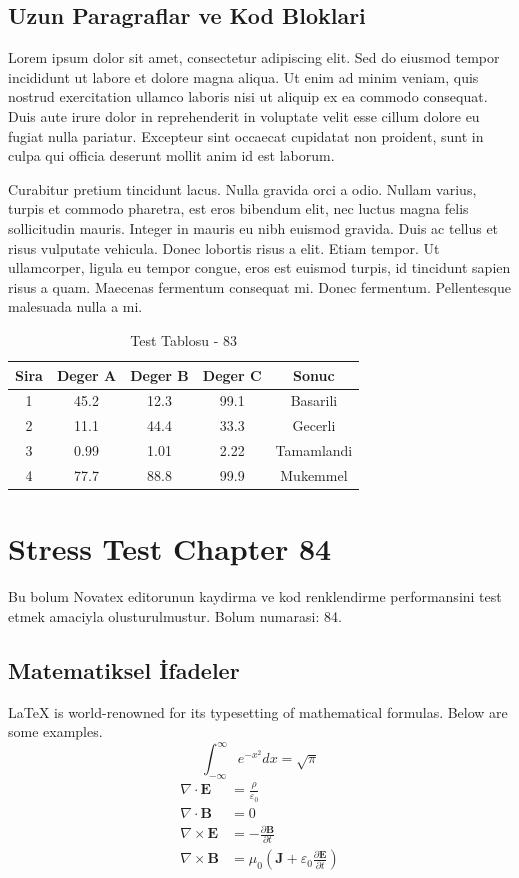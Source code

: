\documentclass[12pt,a4paper]{article}
\begin{document}
\subsection{Uzun Paragraflar ve Kod Bloklari}
Lorem ipsum dolor sit amet, consectetur adipiscing elit. Sed do eiusmod tempor incididunt ut labore et dolore magna aliqua. Ut enim ad minim veniam, quis nostrud exercitation ullamco laboris nisi ut aliquip ex ea commodo consequat. Duis aute irure dolor in reprehenderit in voluptate velit esse cillum dolore eu fugiat nulla pariatur. Excepteur sint occaecat cupidatat non proident, sunt in culpa qui officia deserunt mollit anim id est laborum.

Curabitur pretium tincidunt lacus. Nulla gravida orci a odio. Nullam varius, turpis et commodo pharetra, est eros bibendum elit, nec luctus magna felis sollicitudin mauris. Integer in mauris eu nibh euismod gravida. Duis ac tellus et risus vulputate vehicula. Donec lobortis risus a elit. Etiam tempor. Ut ullamcorper, ligula eu tempor congue, eros est euismod turpis, id tincidunt sapien risus a quam. Maecenas fermentum consequat mi. Donec fermentum. Pellentesque malesuada nulla a mi.

\begin{table}[h!]
\centering
\begin{tabular}{|c|c|c|c|c|}
\hline
\textbf{Sira} & \textbf{Deger A} & \textbf{Deger B} & \textbf{Deger C} & \textbf{Sonuc} \\
\hline
1 & 45.2 & 12.3 & 99.1 & Basarili \\
2 & 11.1 & 44.4 & 33.3 & Gecerli \\
3 & 0.99 & 1.01 & 2.22 & Tamamlandi \\
4 & 77.7 & 88.8 & 99.9 & Mukemmel \\
\hline
\end{tabular}
\caption{Test Tablosu - 83}
\end{table}

\newpage
\section{Stress Test Chapter 84}
Bu bolum Novatex editorunun kaydirma ve kod renklendirme performansini test etmek amaciyla olusturulmustur. Bolum numarasi: 84.

\subsection{Matematiksel İfadeler}
\LaTeX{} is world-renowned for its typesetting of mathematical formulas. Below are some examples.
\begin{equation}
\int_{-\infty}^{\infty} e^{-x^2} dx = \sqrt{\pi}
\end{equation}
\begin{align}
\nabla \cdot \mathbf{E} &= \frac{\rho}{\varepsilon_0} \\
\nabla \cdot \mathbf{B} &= 0 \\
\nabla \times \mathbf{E} &= -\frac{\partial \mathbf{B}}{\partial t} \\
\nabla \times \mathbf{B} &= \mu_0\left(\mathbf{J} + \varepsilon_0 \frac{\partial \mathbf{E}}{\partial t}\right)
\end{align}
\end{document}
